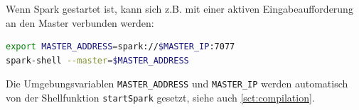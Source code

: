 Wenn Spark gestartet ist, kann sich z.B. mit einer aktiven Eingabeaufforderung an den Master verbunden werden:
\begin{lstlisting}[language=bash]
export MASTER_ADDRESS=spark://$MASTER_IP:7077
spark-shell --master=$MASTER_ADDRESS
\end{lstlisting}\vspace{-1.5\baselineskip}
Die Umgebungsvariablen \lstinline!MASTER_ADDRESS! und \lstinline!MASTER_IP! werden automatisch von der Shellfunktion \lstinline!startSpark! gesetzt, siehe auch \autoref{sct:compilation}.
